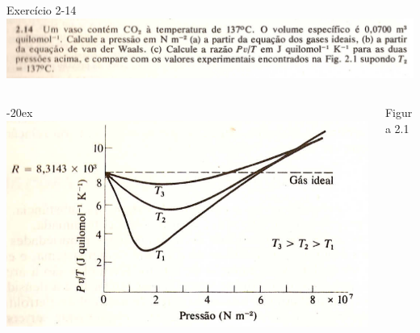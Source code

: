 \documentclass[t,%
brazilian,%
11pt,%
aspectratio=169,%
table%
]{beamer}
\begin{document}

\begin{frame}{Exercício 2-14}
    \centering
    \includegraphics[width=\textwidth]{images/Captura de tela de 2023-04-12 13-20-49.png} \\
    \begin{columns}[c]
        \begin{column}{\textwidth-20ex}
            \includegraphics[height=\textheight-93pt-2pt]{images/Captura de tela de 2023-04-12 13-23-51.png}
        \end{column}
        \begin{column}{20ex}
            Figura 2.1
        \end{column}
    \end{columns}
\end{frame}
\end{document}
